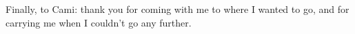 Finally, to Cami: thank you for coming with me to where I wanted to go, and for carrying me when I couldn't go any further.
%
%
%
%
%
%
%
% 
% 
% 
% 
% 
%
% 
% 
% 
% 
% 
%
